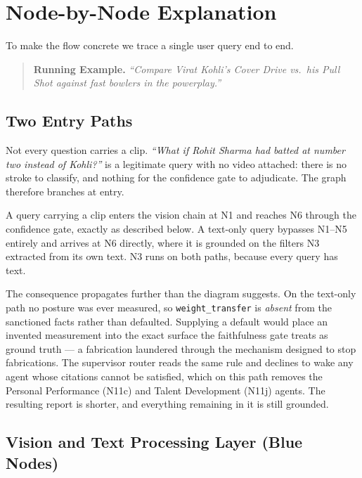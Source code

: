 \documentclass[11pt,a4paper]{article}
\begin{document}
\clearpage
\section{Node-by-Node Explanation}

To make the flow concrete we trace a single user query end to end.

\begin{quote}
\textbf{Running Example.} \emph{``Compare Virat Kohli's Cover Drive vs.\ his Pull
Shot against fast bowlers in the powerplay.''}
\end{quote}

\subsection{Two Entry Paths}

Not every question carries a clip. \emph{``What if Rohit Sharma had batted at
number two instead of Kohli?''} is a legitimate query with no video attached:
there is no stroke to classify, and nothing for the confidence gate to
adjudicate. The graph therefore branches at entry.

A query carrying a clip enters the vision chain at N1 and reaches N6 through the
confidence gate, exactly as described below. A text-only query bypasses
N1--N5 entirely and arrives at N6 directly, where it is grounded on the filters
N3 extracted from its own text. N3 runs on both paths, because every query has
text.

The consequence propagates further than the diagram suggests. On the text-only
path no posture was ever measured, so \texttt{weight\_transfer} is \emph{absent}
from the sanctioned facts rather than defaulted. Supplying a default would place
an invented measurement into the exact surface the faithfulness gate treats as
ground truth --- a fabrication laundered through the mechanism designed to stop
fabrications. The supervisor router reads the same rule and declines to wake any
agent whose citations cannot be satisfied, which on this path removes the
Personal Performance (N11c) and Talent Development (N11j) agents. The resulting
report is shorter, and everything remaining in it is still grounded.

\subsection{Vision and Text Processing Layer (Blue Nodes)}
\end{document}
